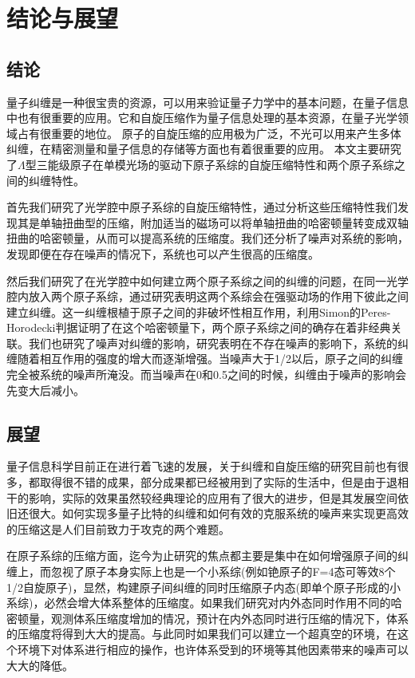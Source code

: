 %
\chapter{结论与展望}\label{chapter5}
\vbox{}\vbox{}
\section{结论}
  量子纠缠是一种很宝贵的资源，可以用来验证量子力学中的基本问题，在量子信息中也有很重要的应用。它和自旋压缩作为量子信息处理的基本资源，在量子光学领域占有很重要的地位。
  原子的自旋压缩的应用极为广泛，不光可以用来产生多体纠缠，在精密测量和量子信息的存储等方面也有着很重要的应用。  
  本文主要研究了$\Lambda$型三能级原子在单模光场的驱动下原子系综的自旋压缩特性和两个原子系综之间的纠缠特性。
  
  首先我们研究了光学腔中原子系综的自旋压缩特性，通过分析这些压缩特性我们发现其是单轴扭曲型的压缩，附加适当的磁场可以将单轴扭曲的哈密顿量转变成双轴扭曲的哈密顿量，从而可以提高系统的压缩度。我们还分析了噪声对系统的影响，发现即便在存在噪声的情况下，系统也可以产生很高的压缩度。
  
  然后我们研究了在光学腔中如何建立两个原子系综之间的纠缠的问题，在同一光学腔内放入两个原子系综，通过研究表明这两个系综会在强驱动场的作用下彼此之间建立纠缠。这一纠缠根植于原子之间的非破坏性相互作用，利用Simon的Peres-Horodecki判据证明了在这个哈密顿量下，两个原子系综之间的确存在着非经典关联。我们也研究了噪声对纠缠的影响，研究表明在不存在噪声的影响下，系统的纠缠随着相互作用的强度的增大而逐渐增强。当噪声大于1/2以后，原子之间的纠缠完全被系统的噪声所淹没。而当噪声在0和0.5之间的时候，纠缠由于噪声的影响会先变大后减小。
  
\vspace{0.5cm}
  \section{展望}
  量子信息科学目前正在进行着飞速的发展，关于纠缠和自旋压缩的研究目前也有很多，都取得很不错的成果，部分成果都已经被用到了实际的生活中，但是由于退相干的影响，实际的效果虽然较经典理论的应用有了很大的进步，但是其发展空间依旧还很大。如何实现多量子比特的纠缠和如何有效的克服系统的噪声来实现更高效的压缩这是人们目前致力于攻克的两个难题。

  在原子系综的压缩方面，迄今为止研究的焦点都主要是集中在如何增强原子间的纠缠上，而忽视了原子本身实际上也是一个小系综(例如铯原子的F=4态可等效8个1/2自旋原子)，显然，构建原子间纠缠的同时压缩原子内态(即单个原子形成的小系综)，必然会增大体系整体的压缩度。如果我们研究对内外态同时作用不同的哈密顿量，观测体系压缩度增加的情况，预计在内外态同时进行压缩的情况下，体系的压缩度将得到大大的提高。与此同时如果我们可以建立一个超真空的环境，在这个环境下对体系进行相应的操作，也许体系受到的环境等其他因素带来的噪声可以大大的降低。
  
    